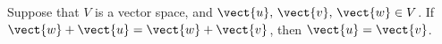 Suppose that $V$ is a vector space, and $\vect{u},\,\vect{v},\,\vect{w}\in V$.  If $\vect{w}+\vect{u}=\vect{w}+\vect{v}$, then $\vect{u}=\vect{v}$.
